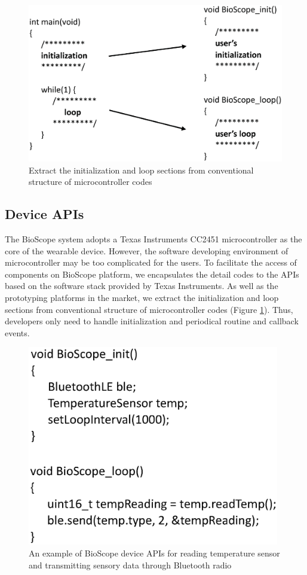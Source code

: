 \begin{figure}
\centering
\includegraphics[width=12cm]{image/mcu_codes.eps}
\caption{Extract the initialization and loop sections from conventional structure of microcontroller codes}
\label{fig_mcu_codes}
\end{figure}

\subsection{Device APIs}
The BioScope system adopts a Texas Instruments CC2451 microcontroller as the core of the wearable device.
However, the software developing environment of microcontroller may be too complicated for the users.
To facilitate the access of components on BioScope platform, we encapsulates the detail codes to the APIs based on the software stack provided by Texas Instruments.
As well as the prototyping platforms in the market, we extract the initialization and loop sections from conventional structure of microcontroller codes (Figure \ref{fig_mcu_codes}).
Thus, developers only need to handle initialization and periodical routine and  callback events.

\begin{figure}[ht]
\centering
\includegraphics[width=11cm]{image/mcu_temp.eps}
\caption{An example of BioScope device APIs for reading temperature sensor and transmitting sensory data through Bluetooth radio}
\label{fig_mcu_temp}
\end{figure}

